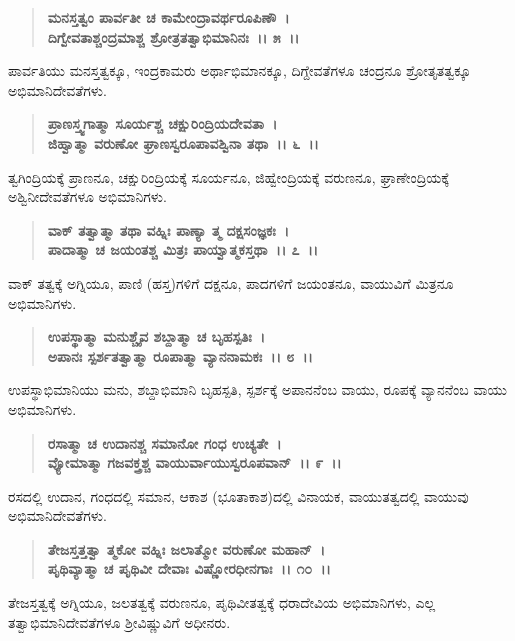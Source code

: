 \begin{verse}
\textbf{ಮನಸ್ತತ್ವಂ ಪಾರ್ವತೀ ಚ ಕಾಮೇಂದ್ರಾವರ್ಥರೂಪಿಣೌ~।}\\\textbf{ದಿಗ್ವೇವತಾಶ್ಚಂದ್ರಮಾಶ್ಚ ಶ್ರೋತ್ರತತ್ವಾಭಿಮಾನಿನಃ~।। ೫~।।}
\end{verse}

ಪಾರ್ವತಿಯು ಮನಸ್ತತ್ವಕ್ಕೂ, ಇಂದ್ರಕಾಮರು ಅರ್ಥಾಭಿಮಾನಕ್ಕೂ, ದಿಗ್ದೇವತೆಗಳೂ ಚಂದ್ರನೂ ಶ್ರೋತೃತತ್ವಕ್ಕೂ ಅಭಿಮಾನಿದೇವತೆಗಳು.

\begin{verse}
\textbf{ಪ್ರಾಣಸ್ತ್ವಗಾತ್ಮಾ ಸೂರ್ಯಶ್ಚ ಚಕ್ಷುರಿಂದ್ರಿಯದೇವತಾ~।}\\\textbf{ಜಿಹ್ವಾತ್ಮಾ ವರುಣೋ ಘ್ರಾಣಸ್ವರೂಪಾವಶ್ವಿನಾ ತಥಾ~।। ೬~।।}
\end{verse}

ತ್ವಗಿಂದ್ರಿಯಕ್ಕೆ ಪ್ರಾಣನೂ, ಚಕ್ಷುರಿಂದ್ರಿಯಕ್ಕೆ ಸೂರ್ಯನೂ, ಜಿಹ್ವೇಂದ್ರಿಯಕ್ಕೆ ವರುಣನೂ, ಘ್ರಾಣೇಂದ್ರಿಯಕ್ಕೆ ಅಶ್ವಿನೀದೇವತೆಗಳೂ ಅಭಿಮಾನಿಗಳು.

\begin{verse}
\textbf{ವಾಕ್ ತತ್ವಾತ್ಮಾ ತಥಾ ವಹ್ನಿಃ ಪಾಣ್ಯಾ ತ್ಮ ದಕ್ಷಸಂಜ್ಞಕಃ~।}\\\textbf{ಪಾದಾತ್ಮಾ ಚ ಜಯಂತಶ್ಚ ಮಿತ್ರಃ ಪಾಯ್ವಾತ್ಮಕಸ್ತಥಾ~।। ೭~।।}
\end{verse}

ವಾಕ್ ತತ್ವಕ್ಕೆ ಅಗ್ನಿಯೂ, ಪಾಣಿ (ಹಸ್ತ)ಗಳಿಗೆ ದಕ್ಷನೂ, ಪಾದಗಳಿಗೆ ಜಯಂತನೂ, ವಾಯುವಿಗೆ ಮಿತ್ರನೂ ಅಭಿಮಾನಿಗಳು.

\begin{verse}
\textbf{ಉಪಸ್ಥಾತ್ಮಾ ಮನುಶ್ಚೈವ ಶಬ್ದಾತ್ಮಾ ಚ ಬೃಹಸ್ಪತಿಃ~।}\\\textbf{ಅಪಾನಃ ಸ್ಪರ್ಶತತ್ವಾತ್ಮಾ ರೂಪಾತ್ಮಾ ವ್ಯಾನನಾಮಕಃ~।। ೮~।।}
\end{verse}

ಉಪಸ್ಥಾಭಿಮಾನಿಯು ಮನು, ಶಬ್ದಾಭಿಮಾನಿ ಬೃಹಸ್ಪತಿ, ಸ್ಪರ್ಶಕ್ಕೆ ಅಪಾನನೆಂಬ ವಾಯು, ರೂಪಕ್ಕೆ ವ್ಯಾನನೆಂಬ ವಾಯು ಅಭಿಮಾನಿಗಳು.

\begin{verse}
\textbf{ರಸಾತ್ಮಾ ಚ ಉದಾನಶ್ಚ ಸಮಾನೋ ಗಂಧ ಉಚ್ಯತೇ~।}\\\textbf{ವ್ಯೋಮಾತ್ಮಾ ಗಜವಕ್ತ್ರಶ್ಚ ವಾಯುರ್ವಾಯುಸ್ವರೂಪವಾನ್~।। ೯~।।}
\end{verse}

ರಸದಲ್ಲಿ ಉದಾನ, ಗಂಧದಲ್ಲಿ ಸಮಾನ, ಆಕಾಶ (ಭೂತಾಕಾಶ)ದಲ್ಲಿ ವಿನಾಯಕ, ವಾಯುತತ್ವದಲ್ಲಿ ವಾಯುವು ಅಭಿಮಾನಿದೇವತೆಗಳು.

\begin{verse}
\textbf{ತೇಜಸ್ತತ್ತತ್ವಾ ತ್ಮಕೋ ವಹ್ನಿಃ ಜಲಾತ್ಮೋ ವರುಣೋ ಮಹಾನ್~।}\\\textbf{ಪೃಥಿವ್ಯಾತ್ಮಾ ಚ ಪೃಥಿವೀ ದೇವಾಃ ವಿಷ್ಣೋರಧೀನಗಾಃ~।। ೧೦~।।}
\end{verse}

ತೇಜಸ್ತತ್ವಕ್ಕೆ ಅಗ್ನಿಯೂ, ಜಲತತ್ವಕ್ಕೆ ವರುಣನೂ, ಪೃಥಿವೀತತ್ವಕ್ಕೆ ಧರಾದೇವಿಯ ಅಭಿಮಾನಿಗಳು, ಎಲ್ಲ ತತ್ವಾಭಿಮಾನಿದೇವತೆಗಳೂ ಶ‍್ರೀವಿಷ್ಣುವಿಗೆ ಅಧೀನರು.

